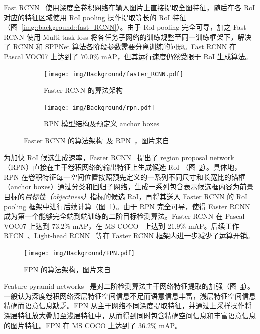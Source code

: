 \documentclass[
  fontset = mac,
]{shtthesis}
\begin{document}
Fast RCNN~\citep{girshick2015fast} 使用深度全卷积网络在输入图片上直接提取全图特征，随后在各 RoI 对应的特征区域使用 RoI pooling 操作提取等长的 RoI 特征（图~\ref{img::background::fast_RCNN}）。由于 RoI pooling 完全可导，加之 Fast RCNN 使用 Multi-task loss 将各任务子网络的训练规整至同一训练框架下，解决了 RCNN 和 SPPNet 算法各阶段参数需要分离训练的问题。Fast RCNN 在 Pascal VOC07 上达到了 $70.0\%$ mAP，但其运行速度仍然受限于 RoI 生成算法。

\begin{figure}[htb]
  \centering
  \begin{subfigure}[t]{0.35\columnwidth}
    \centering
    \texttt{[image: img/Background/faster\_RCNN.pdf]}
    \caption{Faster RCNN 的算法架构}
    \label{img::background::faster_rcnn_arch}
  \end{subfigure}
  \quad
  \begin{subfigure}[t]{0.6\columnwidth}
    \centering
    \texttt{[image: img/Background/rpn.pdf]}
    \caption{RPN 模型结构及预定义 anchor boxes}
    \label{img::background::faster_rcnn_rpn}
  \end{subfigure}
  \caption{Faster RCNN 的算法架构~及 RPN~，图片来自~\citet{ren2015faster}}
  \label{img::background::faster_rcnn}
\end{figure}

为加快 RoI 候选生成速率，Faster RCNN~\citep{ren2015faster} 提出了 region proposal network （RPN）直接在主干卷积网络的输出特征上生成候选 RoI （图~\ref{img::background::faster_rcnn_rpn}）。具体地，RPN 在卷积特征每一空间位置按照预先定义的一系列不同尺寸和长宽比的锚框（anchor boxes）通过分类和回归子网络，生成一系列包含表示候选框内容为前景目标的\emph{目标性（objectness）}指标的候选 RoI，再将其送入 Faster RCNN 的 RoI pooling 框架中进行后续计算（图~\ref{img::background::faster_rcnn_arch}）。由于 RPN 完全可导，使得 Faster RCNN 成为第一个能够完全端到端训练的二阶目标检测算法。Faster RCNN 在 Pascal VOC07 上达到 $73.2\%$ mAP，在 MS COCO~\citep{lin2014microsoft} 上达到 $21.9\%$ mAP。后续工作 RFCN~\citep{dai2016r}、Light-head RCNN~\citep{li2017light} 等在 Faster RCNN 框架内进一步减少了运算开销。

\begin{figure}[htb]
  \centering
  \texttt{[image: img/Background/FPN.pdf]}
  \caption{FPN 的算法架构，图片来自~\citet{lin2017feature}}
  \label{img::background::FPN}
\end{figure}

Feature pyramid networks~\citep{lin2017feature} 是对二阶检测算法主干网络特征提取的加强（图~\ref{img::background::FPN}）。一般认为深度卷积网络深层特征空间信息不足而语意信息丰富，浅层特征空间信息精确而语意信息缺乏。FPN 从主干网络不同深度提取特征，并通过上采样操作将深层特征放大叠加至浅层特征中，从而得到同时包含精确空间信息和丰富语意信息的图片特征。FPN 在 MS COCO 上达到了 $36.2\%$ mAP。
\end{document}

